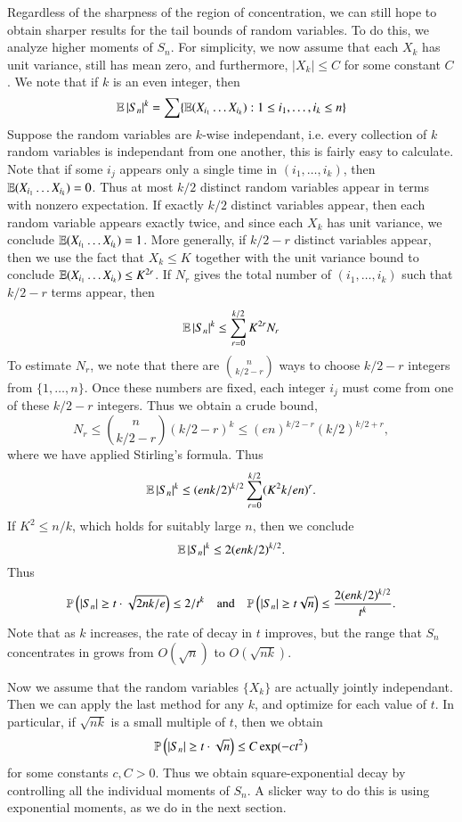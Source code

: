 Regardless of the sharpness of the region of concentration, we can still hope to obtain sharper results for the tail bounds of random variables. To do this, we analyze higher moments of $S_n$. For simplicity, we now assume that each $X_k$ has unit variance, still has mean zero, and furthermore, $|X_k| \leq C$ for some constant $C$. We note that if $k$ is an even integer, then
%
\[ \operatorname{\mathbb{E}} |S_n|^k = \sum \{ \operatorname{\mathbb{E}}(X_{i_1} \dots X_{i_k}) : 1 \leq i_1, \dots, i_k \leq n \} \]
%
Suppose the random variables are $k$-wise independant, i.e. every collection of $k$ random variables is independant from one another, this is fairly easy to calculate. Note that if some $i_j$ appears only a single time in $(i_1, \dots, i_k)$, then $\operatorname{\mathbb{E}}(X_{i_1} \dots X_{i_k}) = 0$. Thus at most $k/2$ distinct random variables appear in terms with nonzero expectation. If exactly $k/2$ distinct variables appear, then each random variable appears exactly twice, and since each $X_k$ has unit variance, we conclude $\operatorname{\mathbb{E}}(X_{i_1} \dots X_{i_k}) = 1$. More generally, if $k/2 - r$ distinct variables appear, then we use the fact that $X_k \leq K$ together with the unit variance bound to conclude $\operatorname{\mathbb{E}}(X_{i_1} \dots X_{i_k}) \leq K^{2r}$. If $N_r$ gives the total number of $(i_1, \dots, i_k)$ such that $k/2 - r$ terms appear, then
%
\[ \operatorname{\mathbb{E}}|S_n|^k \leq \sum_{r = 0}^{k/2} K^{2r} N_r \]
%
To estimate $N_r$, we note that there are ${n \choose k/2 - r}$ ways to choose $k/2 - r$ integers from $\{ 1, \dots, n \}$. Once these numbers are fixed, each integer $i_j$ must come from one of these $k/2 - r$ integers. Thus we obtain a crude bound,
%
\[ N_r \leq {n \choose k/2 - r} (k/2 - r)^k \leq (en)^{k/2 - r}(k/2)^{k/2 + r}, \]
%
where we have applied Stirling's formula. Thus
%
\[ \operatorname{\mathbb{E}} |S_n|^k \leq (enk/2)^{k/2} \sum_{r = 0}^{k/2} (K^2 k / en)^r. \]
%
If $K^2 \leq n/k$, which holds for suitably large $n$, then we conclude
%
\[ \operatorname{\mathbb{E}}|S_n|^k \leq 2(enk/2)^{k/2}. \]
%
Thus
%
\[ \mathbb{P} \left( |S_n| \geq t \cdot \sqrt{2nk/e} \right) \leq 2 / t^k\quad\text{and}\quad \mathbb{P} \left( |S_n| \geq t \sqrt{n} \right) \leq \frac{2(enk/2)^{k/2}}{t^k}. \]
%
Note that as $k$ increases, the rate of decay in $t$ improves, but the range that $S_n$ concentrates in grows from $O(\sqrt{n})$ to $O(\sqrt{nk})$.

Now we assume that the random variables $\{ X_k \}$ are actually jointly independant. Then we can apply the last method for any $k$, and optimize for each value of $t$. In particular, if $\sqrt{nk}$ is a small multiple of $t$, then we obtain
%
\[ \mathbb{P} \left( |S_n| \geq t \cdot \sqrt{n} \right) \leq C \exp(-ct^2) \]
%
for some constants $c,C > 0$. Thus we obtain square-exponential decay by controlling all the individual moments of $S_n$. A slicker way to do this is using exponential moments, as we do in the next section.

